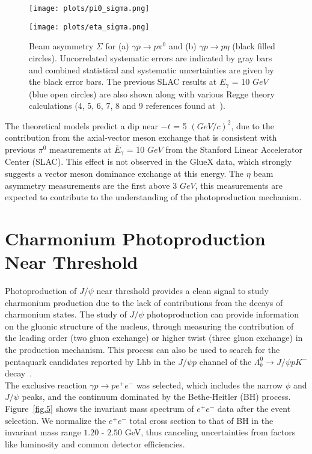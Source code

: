 \documentclass[a4paper]{jpconf}
\begin{document}
\begin{figure}[h]
    \centering
    \begin{minipage}{16pc}
        \texttt{[image: plots/pi0\_sigma.png]}
    \end{minipage}\hspace{2pc}%
    \begin{minipage}{16pc}
        \texttt{[image: plots/eta\_sigma.png]}
    \end{minipage}
    \caption{\label{fig.4} Beam asymmetry $\Sigma$ for (a) $\gamma p \rightarrow p \pi^{0}$ and (b) $\gamma p \rightarrow p \eta$ (black filled circles). Uncorrelated systematic errors are indicated by gray bars and combined statistical and systematic uncertainties are given by the black error bars. The previous SLAC results at $E_{\gamma}$ = 10 $GeV$ (blue open circles) are also shown along with various Regge theory calculations (4, 5, 6, 7, 8 and 9 references found at~\cite{ref.4}).}
\end{figure}

The theoretical models predict a dip near $-t$ = 5 $(GeV/c)^{2}$, due to the contribution from the axial-vector meson exchange that is consistent with previous $\pi^{0}$ measurements at $\bar{E}_{\gamma}$ = 10 $GeV$ from the Stanford Linear Accelerator Center (SLAC). This effect is not observed in the GlueX data, which strongly suggests a vector meson dominance exchange at this energy. The $\eta$ beam asymmetry measurements are the first above 3 $GeV$, this measurements are expected to contribute to the understanding of the photoproduction mechanism.

\section{Charmonium Photoproduction Near Threshold}
Photoproduction of $J/\psi$ near threshold provides a clean signal to study charmonium production due to the lack of contributions from the decays of charmonium states.
The study of $J/\psi$ photoproduction can provide information on the gluonic structure of the nucleus, through measuring the contribution of the leading order (two gluon exchange) or higher twist (three gluon exchange) in the production mechanism. This process can also be used to search for the pentaquark candidates reported by Lhb in the $J/\psi p$ channel of the $\Lambda^{0}_{b} \rightarrow J/\psi p K^{-}$ decay~\cite{ref.5}.\\
The exclusive reaction $\gamma p \rightarrow p e^{+}e^{-}$ was selected, which includes the narrow $\phi$ and $J/\psi$ peaks, and the continuum dominated by the Bethe-Heitler (BH) process. Figure~\ref{fig.5} shows the invariant mass spectrum of $e^{+}e^{-}$ data after the event selection. We normalize the $e^{+}e^{-}$ total cross section to that of BH in the invariant mass range $1.20$ - $2.50$ GeV, thus canceling uncertainties from factors like luminosity and common detector efficiencies.
\end{document}
